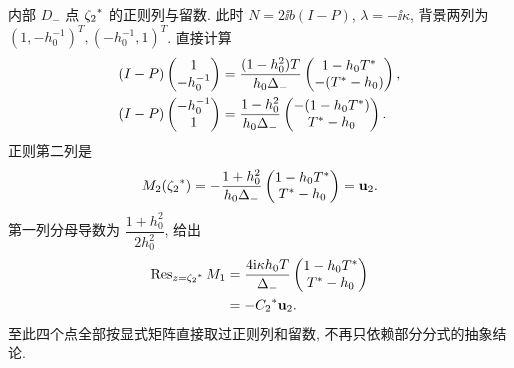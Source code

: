 \par\smallskip\noindent 内部 $D_-$ 点 ${\zeta_2}^{*}$ 的正则列与留数.\quad
此时 $N=2\ii b(I-P)$, $\lambda=-\ii\kappa$,
背景两列为 $(1,-h_0^{-1})^T,(-h_0^{-1},1)^T$.
直接计算
\begin{equation*}
\begin{aligned}
(I-P)\begin{pmatrix}1\\-h_0^{-1}\end{pmatrix}
&=\dfrac{(1-h_0^2)T}{h_0\Delta_-}
\begin{pmatrix}1-h_0{T}^{*}\\-({T}^{*}-h_0)\end{pmatrix},\\
(I-P)\begin{pmatrix}-h_0^{-1}\\1\end{pmatrix}
&=\dfrac{1-h_0^2}{h_0\Delta_-}
\begin{pmatrix}-(1-h_0{T}^{*})\\{T}^{*}-h_0\end{pmatrix}.
\end{aligned}
\end{equation*}
正则第二列是
\begin{equation*}
M_2({\zeta_2}^{*})
=-\dfrac{1+h_0^2}{h_0\Delta_-}
\begin{pmatrix}1-h_0{T}^{*}\\{T}^{*}-h_0\end{pmatrix}
=\mathbf u_2.
\end{equation*}
第一列分母导数为 $\dfrac{1+h_0^2}{2h_0^2}$, 给出
\begin{equation*}
\begin{aligned}
\operatorname{Res}_{z={\zeta_2}^{*}}M_1
&=\dfrac{4\mathrm{i}\kappa h_0T}{\Delta_-}
\begin{pmatrix}1-h_0{T}^{*}\\{T}^{*}-h_0\end{pmatrix}\\
&=-{C_2}^{*}\mathbf u_2.
\end{aligned}
\end{equation*}
至此四个点全部按显式矩阵直接取过正则列和留数,
不再只依赖部分分式的抽象结论.

